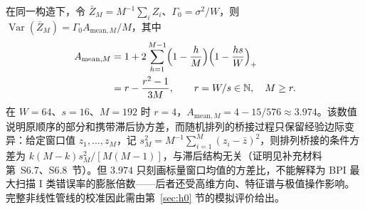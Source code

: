 在同一构造下，令 $\bar Z_M=M^{-1}\sum_iZ_i$、$\Gamma_0=\sigma^2/W$，则 $\operatorname{Var}(\bar Z_M)=\Gamma_0A_{\mathrm{mean},M}/M$，其中
\begin{equation}\label{eq:variance-ratio}
\begin{aligned}
 A_{\mathrm{mean},M}
 &=1+2\sum_{h=1}^{M-1}\Bigl(1-\frac hM\Bigr)\Bigl(1-\frac{hs}{W}\Bigr)_+\\
 &=r-\frac{r^2-1}{3M},
 \qquad r=W/s\in\mathbb N,\quad M\ge r .
\end{aligned}
\end{equation}
在 $W=64$、$s=16$、$M=192$ 时 $r=4$，$A_{\mathrm{mean},M}=4-15/576\approx3.974$。该数值说明原顺序的部分和携带滞后协方差，而随机排列的桥接过程只保留经验边际变异：给定窗口值 $z_1,\ldots,z_M$，记 $s_M^2=M^{-1}\sum_{i=1}^M(z_i-\bar z)^2$，则排列桥接的条件方差为 $k(M-k)s_M^2/[M(M-1)]$，与滞后结构无关（证明见补充材料第~S6.7、S6.8~节）。但 $3.974$ 只刻画标量窗口均值的方差比，不能解释为 BPI 最大扫描 I 类错误率的膨胀倍数——后者还受高维方向、特征谱与极值操作影响。完整非线性管线的校准因此需由第~\ref{sec:h0} 节的模拟评价给出。
